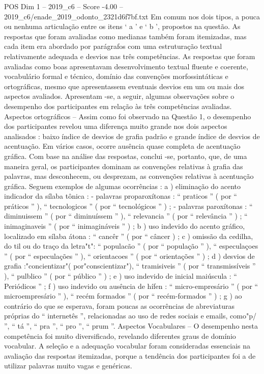 \begin{textsample}{POS Dim 1 – 2019\_c6 – Score -4.00 – 2019\_c6/enade\_2019\_odonto\_2321d6f7bf.txt}
Em comum nos dois tipos, a pouca ou nenhuma articulação entre os itens ‘ a ’ e ‘ b ’, propostos na questão.
As respostas que foram avaliadas como medianas também foram itemizadas, mas cada item era abordado por parágrafos com uma estruturação textual relativamente adequada e desvios nas três competências.
As respostas que foram avaliadas como boas apresentavam desenvolvimento textual fluente e coerente, vocabulário formal e técnico, domínio das convenções morfossintáticas e ortográficas, mesmo que apresentassem eventuais desvios em um ou mais dos aspectos avaliados.
Apresentam -se, a seguir, algumas observações sobre o desempenho dos participantes em relação às três competências avaliadas.
Aspectos ortográficos – Assim como foi observado na Questão 1, o desempenho dos participantes revelou uma diferença muito grande nos dois aspectos analisados : baixo índice de desvios de grafia padrão e grande índice de desvios de acentuação.
Em vários casos, ocorre ausência quase completa de acentuação gráfica.
Com base na análise das respostas, conclui -se, portanto, que, de uma maneira geral, os participantes dominam as convenções relativas à grafia das palavras, mas desconhecem, ou desprezam, as convenções relativas à acentuação gráfica.
Seguem exemplos de algumas ocorrências : a ) eliminação do acento indicador da sílaba tônica : - palavras proparoxítonas : “ praticos ” ( por “ práticos ” ), “ tecnologicos ” ( por “ tecnológicos ” ) ; - palavras paroxítonas : “ diminuissem ” ( por “ diminuíssem ” ), “ relevancia ” ( por “ relevância ” ) ; “ inimaginaveis ” ( por “ inimagináveis ” ) ; b ) uso indevido do acento gráfico, localizado em sílaba átona : “ cancêr ” ( por “ câncer ) ; c ) omissão da cedilha, do til ou do traço da letra"t": “ populacão ” ( por “ população ” ), “ especulaçoes ” ( por “ especulações ” ), “ orientacoes ” ( por “ orientações ” ) ; d ) desvios de grafia :"concientizar"( por"conscientizar"), “ tramisiveis ” ( por “ transmissíveis ” ), “ pulblico ” ( por “ público ” ) ; e ) uso indevido de inicial maiúscula : “ Periódicos ” ; f ) uso indevido ou ausência de hífen : “ micro-empresário ” ( por “ microempresário ” ), “ recém formados ” ( por “ recém-formados ” ) ; g ) ao contrário do que se esperava, foram poucas as ocorrências de abreviaturas próprias do “ internetês ”, relacionadas ao uso de redes sociais e emails, como"p/ ”, “ tá ”, “ pra ”, “ pro ”, “ prum ”.
Aspectos Vocabulares – O desempenho nesta competência foi muito diversificado, revelando diferentes graus de domínio vocabular.
A seleção e a adequação vocabular foram consideradas essenciais na avaliação das respostas itemizadas, porque a tendência dos participantes foi a de utilizar palavras muito vagas e genéricas.

\end{textsample}

